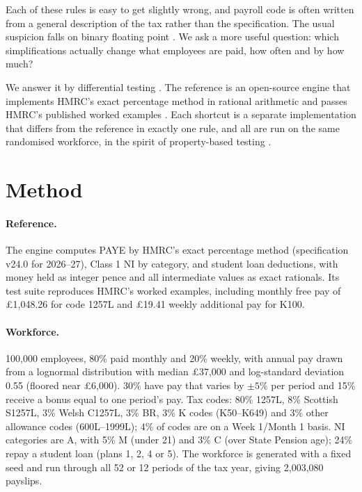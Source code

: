 \documentclass[11pt]{article}
\begin{document}
Each of these rules is easy to get slightly wrong, and payroll code is often written from a general description of the tax rather
than the specification. The usual suspicion falls on binary floating point \cite{goldberg1991,ieee754}. We ask a more useful question:
which simplifications actually change what employees are paid, how often and by how much?

We answer it by differential testing \cite{mckeeman1998}. The reference is an open-source engine that implements HMRC's exact
percentage method in rational arithmetic and passes HMRC's published worked examples \cite{payrollengine}. Each shortcut is a separate
implementation that differs from the reference in exactly one rule, and all are run on the same randomised workforce, in the spirit of
property-based testing \cite{claessen2000quickcheck}.

\section{Method}
\paragraph{Reference.} The engine computes PAYE by HMRC's exact percentage method (specification v24.0 for 2026--27), Class 1 NI by
category, and student loan deductions, with money held as integer pence and all intermediate values as exact rationals. Its test suite
reproduces HMRC's worked examples, including monthly free pay of \pounds1{,}048.26 for code 1257L and \pounds19.41 weekly additional pay
for K100.

\paragraph{Workforce.} 100{,}000 employees, 80\% paid monthly and 20\% weekly, with annual pay drawn from a lognormal distribution with
median \pounds37{,}000 and log-standard deviation 0.55 (floored near \pounds6{,}000). 30\% have pay that varies by \(\pm5\%\) per
period and 15\% receive a bonus equal to one period's pay. Tax codes: 80\% 1257L, 8\% Scottish S1257L, 3\% Welsh C1257L, 3\% BR, 3\% K
codes (K50--K649) and 3\% other allowance codes (600L--1999L); 4\% of codes are on a Week 1/Month 1 basis. NI categories are A, with
5\% M (under 21) and 3\% C (over State Pension age); 24\% repay a student loan (plans 1, 2, 4 or 5). The workforce is generated with a
fixed seed and run through all 52 or 12 periods of the tax year, giving 2{,}003{,}080 payslips.
\end{document}
